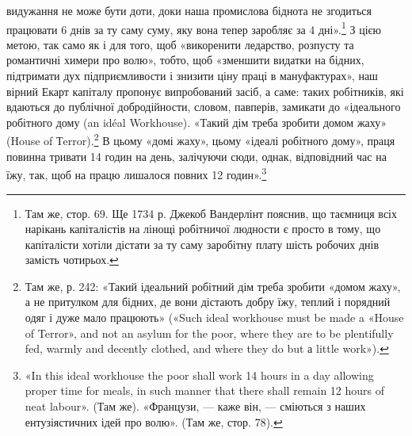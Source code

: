 видужання не може бути доти, доки наша промислова біднота не
згодиться працювати 6 днів за ту саму суму, яку вона тепер заробляє
за 4 дні».\footnote{
Там же, стор. 69. Ще 1734 р. Джекоб Вандерлінт пояснив, що таємниця
всіх нарікань капіталістів на лінощі робітничої людности є просто
в тому, що капіталісти хотіли дістати за ту саму заробітну плату шість
робочих днів замість чотирьох.
} З цією метою, так само як і для того, щоб
«викоренити ледарство, розпусту та романтичні химери про волю»,
тобто, щоб «зменшити видатки на бідних, підтримати дух підприємливости
і знизити ціну праці в мануфактурах», наш вірний
Екарт капіталу пропонує випробований засіб, а саме: таких
робітників, які вдаються до публічної добродійности, словом,
павперів, замикати до «ідеального робітного дому (an idéal Workhouse).
«Такий дім треба зробити домом жаху» (House of Тerror).\footnote{
Там же, р. 242: «Такий ідеальний робітний дім треба зробити «домом
жаху», а не притулком для бідних, де вони дістають добру їжу, теплий
і порядний одяг і дуже мало працюють» («Such ideal workhouse must be
made a «House of Terror», and not an asylum for the poor, where they are
to be plentifully fed, warmly and decently clothed, and where they do but
а little work»).
}
В цьому «домі жаху», цьому «ідеалі робітного дому», праця повинна
тривати 14 годин на день, залічуючи сюди, однак, відповідний час
на їжу, так, щоб на працю лишалося повних 12 годин».\footnote{
«In this ideal workhouse the poor shall work 14 hours in a day
allowing proper time for meals, in such manner that there shall remain
12 hours of neat labour». (Там же). «Французи, — каже він, — сміються
з наших ентузіястичних ідей про волю». (Там же, стор. 78).
}

